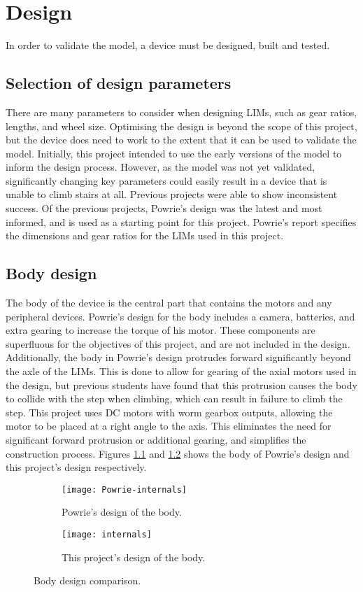 \chapter{Design}

In order to validate the model, a device must be designed, built and tested. 

\section{Selection of design parameters}
There are many parameters to consider when designing LIMs, such as gear ratios, lengths, and wheel size. Optimising the design is beyond the scope of this project, but the device does need to work to the extent that it can be used to validate the model. Initially, this project intended to use the early versions of the model to inform the design process. However, as the model was not yet validated, significantly changing key parameters could easily result in a device that is unable to climb stairs at all. Previous projects were able to show inconsistent success. Of the previous projects, Powrie's design was the latest and most informed, and is used as a starting point for this project. Powrie's report specifies the dimensions and gear ratios for the LIMs used in this project.\\

\section{Body design}
The body of the device is the central part that contains the motors and any peripheral devices.
Powrie's design for the body includes a camera, batteries, and extra gearing to increase the torque of his motor. These components are superfluous for the objectives of this project, and are not included in the design. Additionally, the body in Powrie's design protrudes forward significantly beyond the axle of the LIMs. This is done to allow for gearing of the axial motors used in the design, but previous students have found that this protrusion causes the body to collide with the step when climbing, which can result in failure to climb the step. This project uses DC motors with worm gearbox outputs, allowing the motor to be placed at a right angle to the axis. This eliminates the need for significant forward protrusion or additional gearing, and simplifies the construction process. Figures \ref{fig:Powrie-internals} and \ref{fig:internals} shows the body of Powrie's design and this project's design respectively.
\begin{figure}
	\centering
	\begin{subfigure}{.5\textwidth}
		\centering
		\texttt{[image: Powrie-internals]}
		\caption{Powrie's design of the body.}
		\label{fig:Powrie-internals}
	\end{subfigure}%
	\begin{subfigure}{.5\textwidth}
		\centering
		\texttt{[image: internals]}
		\caption{This project's design of the body.}
		\label{fig:internals}
	\end{subfigure}
	\caption{Body design comparison.}
	\label{fig:bodies}
\end{figure}

